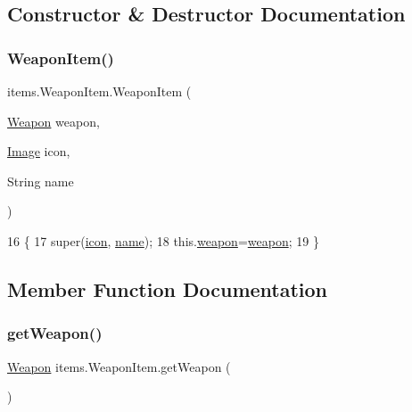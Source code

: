 \subsection{Constructor \& Destructor Documentation}
\mbox{\label{classitems_1_1_weapon_item_ac656d19c4d8f5fd8e63dfd26107e2652}} 
\subsubsection{\texorpdfstring{Weapon\+Item()}{WeaponItem()}}
{\footnotesize\ttfamily items.\+Weapon\+Item.\+Weapon\+Item (\begin{DoxyParamCaption}\item[{\mbox{\hyperlink{classitems_1_1weapons_1_1_weapon}{Weapon}}}]{weapon,  }\item[{\mbox{\hyperlink{classorg_1_1newdawn_1_1slick_1_1_image}{Image}}}]{icon,  }\item[{String}]{name }\end{DoxyParamCaption})\hspace{0.3cm}{\ttfamily [inline]}}


\begin{DoxyCode}
16                                                               \{
17         super(\mbox{\hyperlink{classitems_1_1_item_afa445ad011d48c3455b0c04bec2581f9}{icon}}, \mbox{\hyperlink{classitems_1_1_item_a086327df1ba046bbbe3fa2f753226d73}{name}});
18         this.\mbox{\hyperlink{classitems_1_1_weapon_item_ac409bfd1c448db978d0ebc4ed3a594a6}{weapon}}=\mbox{\hyperlink{classitems_1_1_weapon_item_ac409bfd1c448db978d0ebc4ed3a594a6}{weapon}};
19     \}
\end{DoxyCode}


\subsection{Member Function Documentation}
\mbox{\label{classitems_1_1_weapon_item_a4536195f6a08b29473dbc77e72d33cbd}} 
\subsubsection{\texorpdfstring{get\+Weapon()}{getWeapon()}}
{\footnotesize\ttfamily \mbox{\hyperlink{classitems_1_1weapons_1_1_weapon}{Weapon}} items.\+Weapon\+Item.\+get\+Weapon (\begin{DoxyParamCaption}{ }\end{DoxyParamCaption})\hspace{0.3cm}{\ttfamily [inline]}}


